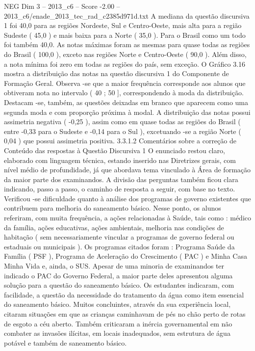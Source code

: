 \begin{textsample}{NEG Dim 3 – 2013\_c6 – Score -2.00 – 2013\_c6/enade\_2013\_tec\_rad\_c2385d971d.txt}
A mediana da questão discursiva 1 foi 40,0 para as regiões Nordeste, Sul e Centro-Oeste, mais alta para a região Sudeste ( 45,0 ) e mais baixa para a Norte ( 35,0 ).
Para o Brasil como um todo foi também 40,0.
As notas máximas foram as mesmas para quase todas as regiões do Brasil ( 100,0 ), exceto nas regiões Norte e Centro-Oeste ( 90,0 ).
Além disso, a nota mínima foi zero em todas as regiões do país, sem exceção.
O Gráfico 3.16 mostra a distribuição das notas na questão discursiva 1 do Componente de Formação Geral.
Observa -se que a maior frequência corresponde aos alunos que obtiveram nota no intervalo ( 40 ; 50 ], correspondendo à moda da distribuição.
Destacam -se, também, as questões deixadas em branco que aparecem como uma segunda moda e com proporção próxima à modal.
A distribuição das notas possui assimetria negativa ( -0,25 ), assim como em quase todas as regiões do Brasil ( entre -0,33 para o Sudeste e -0,14 para o Sul ), excetuando -se a região Norte ( 0,04 ) que possui assimetria positiva. 3.3.1.2 Comentários sobre a correção de Conteúdo das respostas à Questão Discursiva 1 O enunciado restou claro, elaborado com linguagem técnica, estando inserido nas Diretrizes gerais, com nível médio de profundidade, já que abordava tema vinculado à Área de formação da maior parte dos examinandos.
A divisão das perguntas também ficou clara indicando, passo a passo, o caminho de resposta a seguir, com base no texto.
Verificou -se dificuldade quanto à análise dos programas de governo existentes que contribuem para melhoria do saneamento básico.
Nesse ponto, os alunos referiram, com muita frequência, a ações relacionadas à Saúde, tais como : médico da família, ações educativas, ações ambientais, melhoria nas condições de habitação ( sem necessariamente vincular a programas de governo federal ou estaduais ou municipais ).
Os programas citados foram : Programa Saúde da Família ( PSF ), Programa de Aceleração do Crescimento ( PAC ) e Minha Casa Minha Vida e, ainda, o SUS.
Apesar de uma minoria de examinandos ter indicado o PAC do Governo Federal, a maior parte deles apresentou alguma solução para a questão do saneamento básico.
Os estudantes indicaram, com facilidade, a questão da necessidade do tratamento da água como item essencial do saneamento básico.
Muitos concluintes, através da sua experiência local, citaram situações em que as crianças caminhavam de pés no chão perto de rotas de esgoto a céu aberto.
Também criticaram a inércia governamental em não combater as invasões ilícitas, em locais inadequados, sem estrutura de água potável e também de saneamento básico.

\end{textsample}
